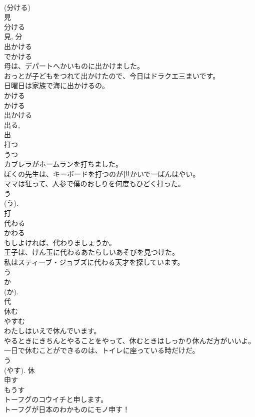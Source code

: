 \documentclass[8pt]{extreport}
\begin{document}
\begin{CJK}{UTF8}{min}
\\	(分ける) 
\\	見 
\\	分ける 
\\	見, 分	
\\	出かける	
\\	でかける	
\\	母は、デパートへかいものに出かけました。	
\\	おっとが子どもをつれて出かけたので、今日はドラクエ三まいです。	
\\	日曜日は家族で海に出かけるの。	
\\	かける 
\\	かける 
\\	出かける
\\	出る, 
\\	出	
\\	打つ	
\\	うつ	
\\	カブレラがホームランを打ちました。	
\\	ぼくの先生は、キーボードを打つのが世かいで一ばんはやい。	
\\	ママは狂って、人参で僕のおしりを何度もひどく打った。	
\\	う 
\\	(う). 
\\	打	
\\	代わる	
\\	かわる	
\\	もしよければ、代わりましょうか。	
\\	王子は、けん玉に代わるあたらしいあそびを見つけた。	
\\	私はスティーブ・ジョブズに代わる天才を探しています。	
\\	う 
\\	か 
\\	(か). 
\\	代	
\\	休む	
\\	やすむ	
\\	わたしはいえで休んでいます。	
\\	やるときにきちんとやることをやって、休むときはしっかり休んだ方がいいよ。	
\\	一日で休むことができるのは、トイレに座っている時だけだ。	
\\	う 
\\	(やす).	休	
\\	申す	
\\	もうす	
\\	トーフグのコウイチと申します。	
\\	トーフグが日本のわかものにモノ申す！	

\end{CJK}
\end{document}
